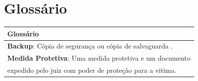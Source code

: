 \documentclass[
	12pt,				%
    oneside,			%
	a4paper,			%
	english,			%
	french,				%
	spanish,			%
	brazil,				%
	]{abntex2}
\begin{document}
			\section{Glossário}
	
				\begin{center}
				
				\begin{tabular}{|l|}
					
					\hline
			\textbf{Glossário}\label{glo}	  
					\\ \hline
					\textbf{Backup}: Cópia de segurança ou cópia de salvaguarda
					 .                                                                   \\ \hline
					
					\textbf{Medida Protetiva}: Uma medida protetiva e um documento                                      \\ 
					expedido pelo juiz com poder de proteção para a vitima.                           
					\\ \hline
				\end{tabular}
				
			\end{center}


\postextual




%

\clearpage


\begin{apendicesenv}

\partapendices




\end{apendicesenv}
\end{document}
